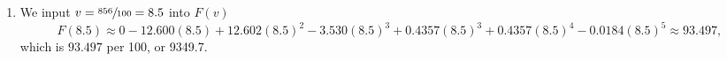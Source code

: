 \begin{solution}
\begin{enumerate}
    \item We input $v = \sfrac{856}{100} = 8.5$ into $F(v)$
      \[%
        F(8.5) \approx 0 - 12.600(8.5) + 12.602(8.5)^2 - 3.530(8.5)^3 + 0.4357(8.5)^3 + 0.4357(8.5)^4 - 0.0184(8.5)^5 \approx 93.497
      ,\]%
      which is $93.497$ per \SI{100}{\pound}, or \SI{9349.7}{\pound}.\qedhere
  \end{enumerate}
\end{solution}



\newpage
